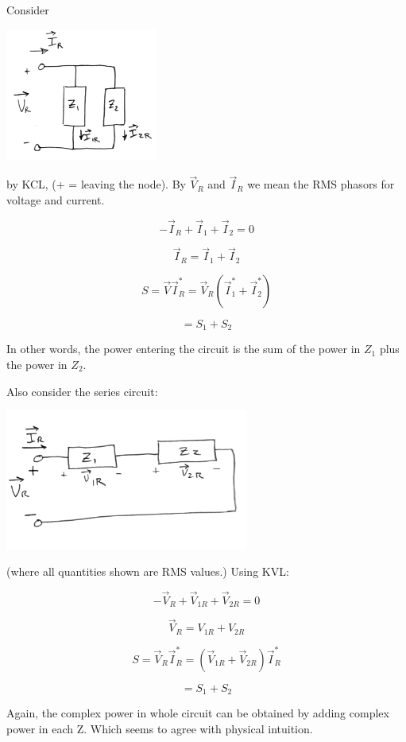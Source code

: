 \noindent Consider

\includegraphics[width=50mm]{figsChapt03/QM27615.png}

by KCL, (+ = leaving the node).   By $\vec V_R$ and $\vec I_R$ we mean
the RMS phasors for voltage and current.

\[
-\vec{I}_R + \vec{I}_{1} + \vec{I}_{2} = 0
\]


\[
\vec{I}_R = \vec{I}_{1} + \vec{I}_{2}
\]

\[
S = \vec{V} \vec{I}_R^* = \vec{V}_R (\vec{I}_{1}^* + \vec{I}_{2}^*)
\]

\[
= S_1 + S_2
\]

In other words, the power entering the circuit is the sum of the power in
$Z_1$ plus the power in $Z_2$.



\noindent Also consider the series circuit:

\includegraphics[width=80mm]{figsChapt03/RQ15238.png}

(where all quantities shown are RMS values.)
Using KVL:

\[
-\vec{V}_R + \vec{V}_{1R} + \vec{V}_{2R} = 0
\]

\[
 \vec{V}_R = V_{1R} + V_{2R}
\]

\[
S = \vec{V}_R \vec{I}_R^* = (\vec{V}_{1R} + \vec{V}_{2R}) \vec{I}_R^*
\]

\[
= S_1 + S_2
\]

Again, the complex power in whole circuit can be obtained by
adding complex power in each Z.  Which seems to agree with physical
intuition.




